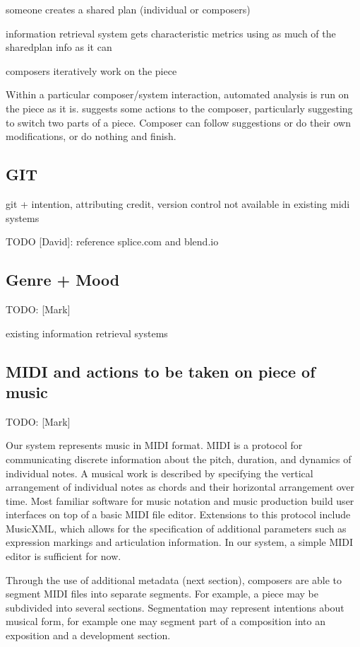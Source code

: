 \documentclass[final,authoryear,11pt,times]{elsarticle}
\begin{document}
someone creates a shared plan (individual or composers)

information retrieval system gets characteristic metrics using as much of the sharedplan info as it can

composers iteratively work on the piece

Within a particular composer/system interaction, automated analysis is run on the piece as it is.
suggests some actions to the composer, particularly suggesting to switch two parts of a piece.
Composer can follow suggestions or do their own modifications, or do nothing and finish.

\subsection{GIT}

git + intention, attributing credit, version control not available in existing midi systems

TODO [David]: reference splice.com and blend.io


\subsection{Genre + Mood}

TODO: [Mark]

existing information retrieval systems

\subsection{MIDI and actions to be taken on piece of music}
TODO: [Mark]

Our system represents music in MIDI format. MIDI is a protocol for communicating discrete information about the pitch, duration, and dynamics of individual notes. A musical work is described by specifying the vertical arrangement of individual notes as chords and their horizontal arrangement over time. Most familiar software for music notation and music production build user interfaces on top of a basic MIDI file editor. Extensions to this protocol include MusicXML, which allows for the specification of additional parameters such as expression markings and articulation information. In our system, a simple MIDI editor is sufficient for now.

Through the use of additional metadata (next section), composers are able to segment MIDI files into separate segments. For example, a piece may be subdivided into several sections. Segmentation may represent intentions about musical form, for example one may segment part of a composition into an exposition and a development section.
\end{document}
